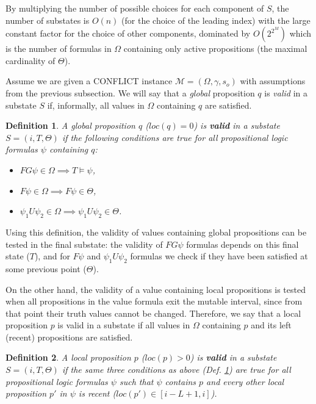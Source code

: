 \documentclass[]{jair}
\newtheorem{Definition}{Definition}
\begin{document}
By multiplying the number of possible choices for each component of $S$, 
the number of substates is $O(n)$ (for the choice of the leading index) with the large constant factor for the choice of other components, dominated by $O(2^{2^M})$ which is the number of formulas in $\Omega$ containing only active propositions
(the maximal cardinality of $\Theta$).

Assume we are given a CONFLICT instance $\mathcal{M}=(\Omega, \gamma, s_o)$ with assumptions from the previous subsection.  We will say that a {\it global} proposition $q$ is {\it valid} in a substate $S$ if, informally,
all values in $\Omega$ containing $q$ are satisfied. 

\begin{Definition}\label{gval}
A global proposition $q$ ($loc(q)=0$) is {\bf valid} in a substate $S = (i, T, \Theta)$ if the following conditions are true for all propositional logic formulas $\psi$ containing $q$:
\begin{itemize}
    \item $FG\psi\in\Omega\implies T\models \psi$, 
    \item $F\psi\in\Omega\implies F\psi\in \Theta$,
    \item $\psi_1 U \psi_2\in\Omega\implies \psi_1 U \psi_2\in \Theta$.
\end{itemize}
\end{Definition}

Using this definition, the validity of values containing global propositions can be tested in the final substate: the validity of $FG\psi$ formulas depends on this final state ($T$), 
and for $F\psi$ and $\psi_1 U\psi_2$ formulas we check if they have been satisfied at some previous point ($\Theta$).

On the other hand, the validity of a value containing local propositions is tested when all propositions in the value formula exit the mutable interval, since from that point their truth values cannot be changed. 
Therefore, we say that a local proposition $p$ is valid in a substate if all values in $\Omega$ containing $p$ and its left (recent) propositions are satisfied.

\begin{Definition}\label{lval}
    A local proposition $p$ ($loc(p)>0$) is {\bf valid} in a substate $S = (i, T, \Theta)$ if the same three conditions as above (Def. \ref{gval}) are true for all propositional logic formulas $\psi$ such that $\psi$ contains $p$ and every other local proposition $p'$ in $\psi$ is recent ($loc(p')\in [i-L+1, i]$).
\end{Definition}
\end{document}
